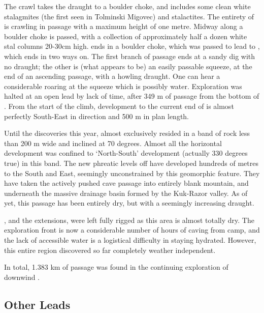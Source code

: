 The  crawl  takes the
draught to a boulder choke, and includes some clean white stalagmites
(the first seen in Tolminski Migovec) and stalactites. The entirety of
 is crawling in passage with a maximum height of one
metre. Midway along  a boulder choke is passed, with a
collection of approximately half a dozen white stal columns 20-30cm
high.  ends in a boulder choke, which was passed to lead
to , which ends in two ways on. The first branch of
passage ends at a sandy dig with no draught; the other is (what appears
to be) an easily passable squeeze, at the end of an ascending passage,
with a howling draught. One can hear a considerable roaring at the
squeeze which is possibly water. Exploration was halted at an open lead
by lack of time, after 349 m of passage from the bottom of . From the start of the  climb, development
to the current end of  is almost perfectly South-East in
direction and 500 m in plan length.

Until the discoveries this year,  almost exclusively
resided in a band of rock less than 200 m wide and inclined at 70
degrees. Almost all the horizontal development was confined to
`North-South' development (actually 330 degrees true) in this band. The
new phreatic levels off  have developed hundreds of
metres to the South and East, seemingly unconstrained by this geomorphic
feature. They have taken the actively pushed cave passage into entirely
blank mountain, and underneath the massive drainage basin formed by the
Kuk-Razor valley. As of yet, this passage has been entirely dry, but
with a seemingly increasing draught.

, and the  extensions, were left fully
rigged as this area is almost totally dry. The exploration front is now
a considerable number of hours of caving from camp, and the lack of
accessible water is a logistical difficulty in staying hydrated.
However, this entire region discovered so far completely weather
independent.

In total, 1.383 km of passage was found in the continuing exploration of
downwind .


\subsection{Other Leads}

